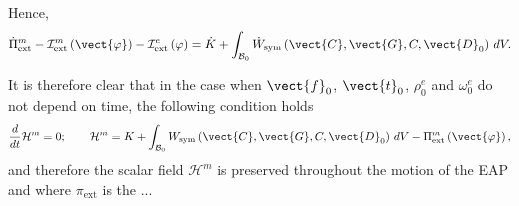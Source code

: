 Hence,
%
\begin{equation}
\dot{\Pi}_{\text{ext}}^m - \mathcal{I}^m_{\text{ext}}\left(\vect{\varphi}\right) -
\mathcal{I}^e_{\text{ext}}\left({\varphi}\right) = \dot{K} + \int_{\mathcal{B}_0}\dot{W}_{\text{sym}}\left(\vect{C},\vect{G},C,\vect{D}_0\right)\,dV.
\end{equation}

It is therefore clear that in the case when $\vect{f}_0$, $\vect{t}_0$, $\rho^e_0$ and $\omega^e_0$ do not depend on time, the following condition holds
%
\begin{equation}\label{eqn:conservation 1 appendix}
\frac{d}{dt}\mathcal{H}^m = 0;\qquad
\mathcal{H}^m =K + \int_{\mathcal{B}_0}W_{\text{sym}}\left(\vect{C},\vect{G},C,\vect{D}_0\right)\,dV - \Pi^m_{\text{ext}}\left(\vect{\varphi}\right),
\end{equation}
%
and therefore the scalar field $\mathcal{H}^m$ is preserved throughout the motion of the EAP and where $\pi_{\text{ext}}$ is the ...

\noindent\makebox[\linewidth]{\rule{\textwidth}{0.4pt}}

